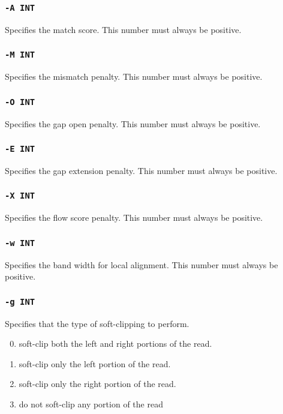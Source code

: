 \documentclass[a4paper,12pt]{book}
\newcommand{\TT}[1]{{\tt #1}} %
\begin{document}
\subsubsection{\TT{-A INT}}
Specifies the match score.
This number must always be positive.

\subsubsection{\TT{-M INT}}
Specifies the mismatch penalty.
This number must always be positive.

\subsubsection{\TT{-O INT}}
Specifies the gap open penalty.
This number must always be positive.

\subsubsection{\TT{-E INT}}
Specifies the gap extension penalty.
This number must always be positive.

\subsubsection{\TT{-X INT}}
Specifies the flow score penalty.
This number must always be positive.

\subsubsection{\TT{-w INT}}
Specifies the band width for local alignment.
This number must always be positive.

\subsubsection{\TT{-g INT}}
Specifies that the type of soft-clipping to perform.
\begin{enumerate}
	\setcounter{enumi}{-1} %
	\item soft-clip both the left and right portions of the read.
	\item soft-clip only the left portion of the read.
	\item soft-clip only the right portion of the read.
	\item do not soft-clip any portion of the read
\end{enumerate}
\end{document}
